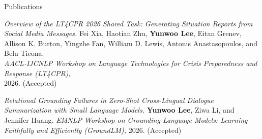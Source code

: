 \documentclass[
	11pt, %
]{resume} %
\begin{document}

\begin{rSection}{Publications}
\begin{enumerate}[label={[\arabic*]}, leftmargin=*, itemsep=0.5em, topsep=0pt]
\item \textit{Overview of the LT4CPR 2026 Shared Task: Generating Situation Reports from Social Media Messages.} Fei Xia, Haotian Zhu, \textbf{Yunwoo Lee}, Eitan Grenev, Allison K. Burton, Yingzhe Fan, William D. Lewis, Antonis Anastasopoulos, and Belu Ticona.\\
\textit{AACL-IJCNLP Workshop on Language Technologies for Crisis Preparedness and Response (LT4CPR),}\\
2026. (Accepted)

\item \textit{Relational Grounding Failures in Zero-Shot Cross-Lingual Dialogue Summarization with Small Language Models.}
\textbf{Yunwoo Lee}, Ziwa Li, and Jennifer Huang.
\textit{EMNLP Workshop on Grounding Language Models: Learning Faithfully and Efficiently (GroundLM),} 2026. (Accepted)
\end{enumerate}

\end{rSection}

\end{document}
